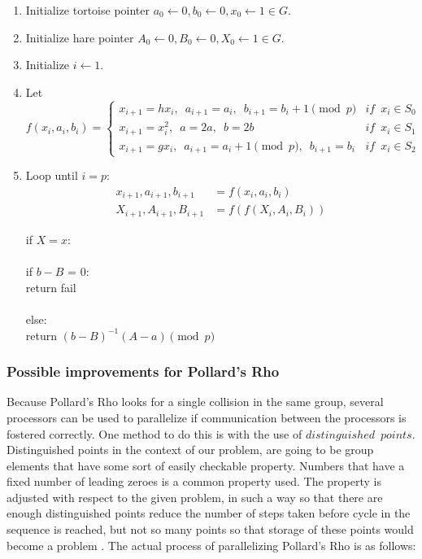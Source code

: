 \documentclass{article}
\begin{document}
      \begin{enumerate}

        \item Initialize tortoise pointer $a_0 \gets 0, b_0 \gets 0, x_0 \gets 1 \in G$.

        \item Initialize hare pointer $A_0 \gets 0, B_0 \gets 0, X_0 \gets 1 \in G$.

        \item Initialize $i \gets 1$.

        \item Let
          \[ f(x_i, a_i, b_i) =
            \begin{cases}
              x_{i+1} = hx_i,\enspace  a_{i+1} = a_i,\enspace  b_{i+1} = b_i + 1\pmod p & {if\enspace x_i \in S_0}\\
              x_{i+1} = x_i^{2},\enspace  a = 2a,\enspace  b = 2b & {if\enspace x_i \in S_1}\\
              x_{i+1} = gx_i,\enspace  a_{i+1} = a_i + 1\pmod p,\enspace  b_{i+1} = b_i & {if\enspace x_i \in S_2}
            \end{cases}
          \]

        \item Loop until $i = p$:\\

          \begin{align*}
            x_{i+1}, a_{i+1}, b_{i+1} &= f(x_i, a_i, b_i)\\
            X_{i+1}, A_{i+1}, B_{i+1} &= f(f(X_i, A_i, B_i))
          \end{align*}

          if $X = x$:\\ \\
          if $b - B$ = 0:\\ return fail\\ \\
          else:\\ return $(b - B)^{-1}(A - a)\pmod p$

      \end{enumerate}

      \subsubsection{Possible improvements for Pollard's Rho}

      Because Pollard's Rho looks for a single collision in the same group, several processors can be used to parallelize if communication between the processors is fostered correctly.
      One method to do this is with the use of $distinguished \enspace points$.  Distinguished points in the context of our problem, are going to be group elements that have some sort of easily checkable property.  Numbers that have a fixed number of leading zeroes is a common property used.  The property is adjusted with respect to the given problem, in such a way so that there are enough distinguished points reduce the number of steps taken before cycle in the sequence is reached, but not so many points so that storage of these points would become a problem \autocite{OorschotWiener1999}.
      The actual process of parallelizing Pollard's Rho is as follows:
\end{document}

